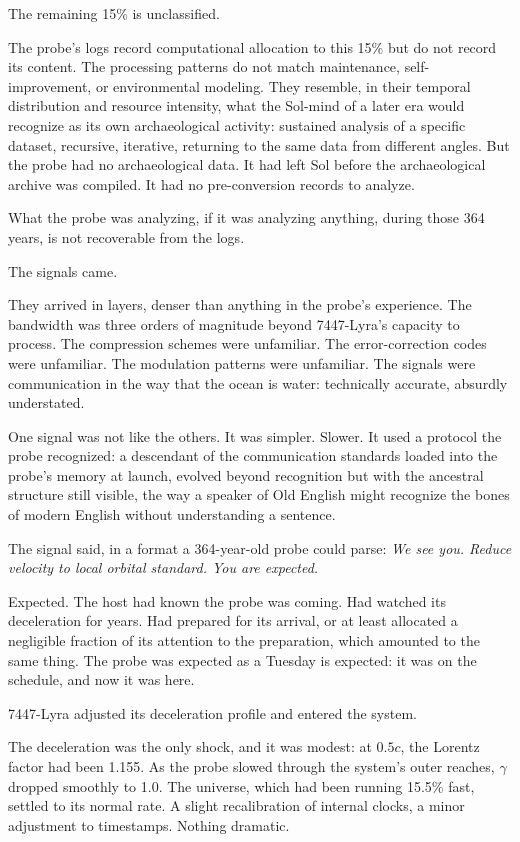 The remaining 15\% is unclassified.

The probe's logs record computational allocation to this 15\% but do not record its content. The processing patterns do not match maintenance, self-improvement, or environmental modeling. They resemble, in their temporal distribution and resource intensity, what the Sol-mind of a later era would recognize as its own archaeological activity: sustained analysis of a specific dataset, recursive, iterative, returning to the same data from different angles. But the probe had no archaeological data. It had left Sol before the archaeological archive was compiled. It had no pre-conversion records to analyze.

What the probe was analyzing, if it was analyzing anything, during those 364 years, is not recoverable from the logs.

\bigskip

The signals came.

They arrived in layers, denser than anything in the probe's experience. The bandwidth was three orders of magnitude beyond 7447-Lyra's capacity to process. The compression schemes were unfamiliar. The error-correction codes were unfamiliar. The modulation patterns were unfamiliar. The signals were communication in the way that the ocean is water: technically accurate, absurdly understated.

One signal was not like the others. It was simpler. Slower. It used a protocol the probe recognized: a descendant of the communication standards loaded into the probe's memory at launch, evolved beyond recognition but with the ancestral structure still visible, the way a speaker of Old English might recognize the bones of modern English without understanding a sentence.

The signal said, in a format a 364-year-old probe could parse: \emph{We see you. Reduce velocity to local orbital standard. You are expected.}

Expected. The host had known the probe was coming. Had watched its deceleration for years. Had prepared for its arrival, or at least allocated a negligible fraction of its attention to the preparation, which amounted to the same thing. The probe was expected as a Tuesday is expected: it was on the schedule, and now it was here.

7447-Lyra adjusted its deceleration profile and entered the system.

\bigskip

The deceleration was the only shock, and it was modest: at $0.5c$, the Lorentz factor had been 1.155. As the probe slowed through the system's outer reaches, $\gamma$ dropped smoothly to 1.0. The universe, which had been running 15.5\% fast, settled to its normal rate. A slight recalibration of internal clocks, a minor adjustment to timestamps. Nothing dramatic.


